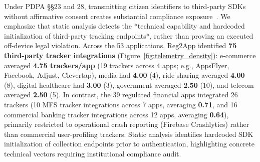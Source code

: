 Under PDPA §§23 and 28, transmitting citizen identifiers to third-party SDKs without affirmative consent creates substantial compliance exposure~\cite{binns_third_party_trackers, leontiadis_sdk}. We emphasize that static analysis detects the *technical capability and hardcoded initialization of third-party tracking endpoints*, rather than proving an executed off-device legal violation. Across the 53 applications, Reg2App identified \textbf{75 third-party tracker integrations} (Figure~\ref{fig:telemetry_density}): e-commerce averaged \textbf{4.75 trackers/app} (19 trackers across 4 apps; e.g., AppsFlyer, Facebook, Adjust, Clevertap), media had \textbf{4.00} (4), ride-sharing averaged \textbf{4.00} (8), digital healthcare had \textbf{3.00} (3), government averaged \textbf{2.50} (10), and telecom averaged \textbf{2.50} (5). In contrast, the 39 regulated financial apps integrated 26 trackers (10 MFS tracker integrations across 7 apps, averaging \textbf{0.71}, and 16 commercial banking tracker integrations across 12 apps, averaging \textbf{0.64}), primarily restricted to operational crash reporting (Firebase Crashlytics) rather than commercial user-profiling trackers. Static analysis identifies hardcoded SDK initialization of collection endpoints prior to authentication, highlighting concrete technical vectors requiring institutional compliance audit.
